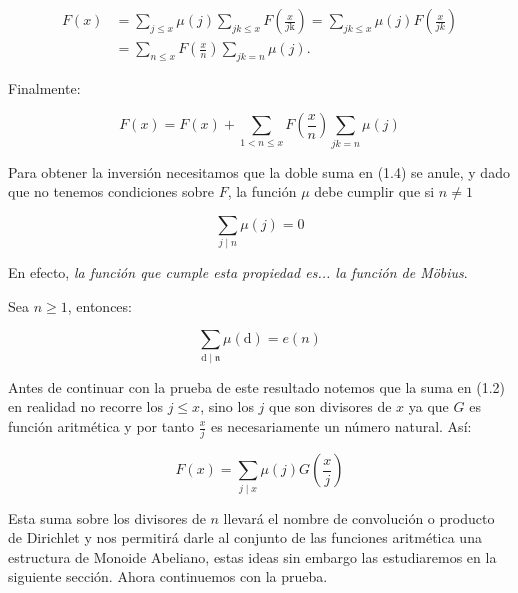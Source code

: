 \begin{align*}
    F(x)&=\sum_{j \leqslant x} \mu(j)\sum_{jk\leq x} F\left(\frac{x}{j \mathrm{k}}\right)=\sum_{jk\leq x}\mu(j)F \left( \frac{x}{jk} \right)\\
    &=\sum_{n\leq x}F \left( \frac{x}{n} \right)\sum_{jk=n}\mu(j)
.\end{align*}

Finalmente:

\begin{equation}
F(x)=F(x)+\sum_{1<n\leq x}F \left( \frac{x}{n} \right)\sum_{jk=n}\mu(j)
\end{equation}

Para obtener la inversión necesitamos que la doble suma en (1.4) se anule, y dado que no tenemos condiciones sobre $F$, la función $\mu$ debe cumplir que si $n \neq 1$

$$\sum_{j\mid n}\mu(j)=0$$

En efecto, \textit{la función que cumple esta propiedad es... la función de Möbius}.

\begin{theorem}
Sea $n \geqslant 1$, entonces:

$$\sum_{\mathrm{d} \mid \mathfrak{n}} \mu(\mathrm{d})=e(n)$$

\end{theorem}
Antes de continuar con la prueba de este resultado notemos que la suma en (1.2) en realidad no recorre los $j\leqslant x$, sino los $j$ que son divisores de $x$ ya que $G$ es función aritmética y por tanto $\frac{x}{j}$ es necesariamente un número natural. Así:

\begin{equation}
F(x)=\sum_{j \mid x} \mu(j) G\left(\frac{x}{j}\right)
\end{equation}

Esta suma sobre los divisores de $n$ llevará el nombre de convolución o producto de Dirichlet y nos permitirá darle al conjunto de las funciones aritmética una estructura de Monoide Abeliano, estas ideas sin embargo las estudiaremos en la  siguiente sección. Ahora continuemos con la prueba.\\

